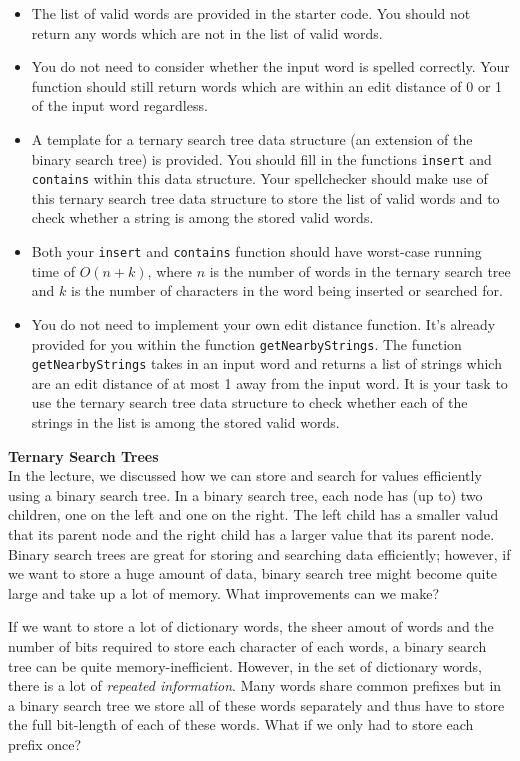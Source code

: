 \documentclass[addpoints,12pt,answers]{exam}
\begin{document}
\begin{questions}
\begin{itemize}
	\item The list of valid words are provided in the starter code. You should not return any words which are not in the list of valid words.
	
	\item You do not need to consider whether the input word is spelled correctly. Your function should still return words which are within 
	an edit distance of 0 or 1 of the input word regardless.

	\item A template for a ternary search tree data structure (an extension of the binary search tree) is provided. You should fill in the 
	functions \texttt{insert} and \texttt{contains} within this data structure. Your spellchecker should make use of this ternary search tree
	data structure to store the list of valid words and to check whether a string is among the stored valid words. 

	\item Both your \texttt{insert} and \texttt{contains} function should have worst-case running time of $O(n + k)$, where $n$ is the number 
	of words in the ternary search tree and $k$ is the number of characters in the word being inserted or searched for.

	\item You do not need to implement your own edit distance function. It's already provided for you within the function \texttt{getNearbyStrings}.
	The function \texttt{getNearbyStrings} takes in an input word and returns a list of strings which are an edit distance of at most 1 away from 
	the input word. It is your task to use the ternary search tree data structure to check whether each of the strings in the list is among the 
	stored valid words.
\end{itemize}

\textbf{Ternary Search Trees}\\
In the lecture, we discussed how we can store and search for values efficiently using a binary search tree. In a binary search tree, each node has
(up to) two children, one on the left and one on the right. The left child has a smaller valud that its parent node and the right child has a larger 
value that its parent node. Binary search trees are great for storing and searching data efficiently; however, if we want to store a huge amount of data,
binary search tree might become quite large and take up a lot of memory. What improvements can we make?

If we want to store a lot of dictionary words, the sheer amout of words and the number of bits required to store each character of each words, 
a binary search tree can be quite memory-inefficient. However, in the set of dictionary words, there is a lot of \textit{repeated information}.
Many words share common prefixes but in a binary search tree we store all of these words separately and thus have to store the full bit-length of 
each of these words. What if we only had to store each prefix once?


\end{questions}
\end{document}
